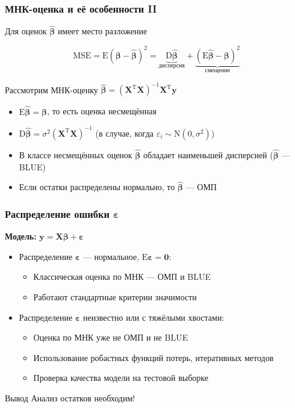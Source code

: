 \documentclass[ucs, notheorems, handout]{beamer}
\newcommand{\betah}{\hat{\bm \beta}}
\newcommand{\betaa}{\bm{\beta}}
\newcommand{\epss}{\bm{\varepsilon}}
\newcommand{\E}{\mathrm{E}}
\newcommand{\D}{\mathrm{D}}
\newcommand{\XT}{{\bm{X}}^{\mathrm{T}}}
\newcommand{\X}{\bm{X}}
\begin{document}
\begin{frame}
     \frametitle{МНК-оценка и её особенности II}
 Для оценок $\betah$ имеет место разложение     \begin{block}{}
$$\mathrm{MSE} = \E(\betaa - \betah)^2 = \underbrace{\mathrm D \betah}_{\text{дисперсия}} + \underbrace{(\mathrm E \betah - \betaa)^2}_{\text{смещение}}$$
\end{block}

Рассмотрим МНК-оценку $\betah = (\X^\mathrm{T}\X)^{-1} \X^\mathrm{T} \bm y$
    
\begin{itemize}
	\item $\E \betah = \betaa$, то есть оценка несмещённая
	\item $\D \betah = \sigma^2 (\XT\X)^{-1}$ (в случае, когда $\varepsilon_i \sim \mathrm N(0, \sigma^2)$)
	\item В классе несмещённых оценок $\betah$ обладает наименьшей дисперсией ($\betah$ --- BLUE)
	\item Если остатки распределены нормально, то $\betah$ --- ОМП
 \end{itemize}


    \note{

    }
\end{frame}


\begin{frame}
    \frametitle{Распределение ошибки $\epss$}
    \textbf{Модель:} $\bm y = \X \betaa + \epss$

\begin{itemize}
	\item Распределение $\epss$ --- нормальное, $\E \epss = \bm 0$:
 \begin{itemize}
 	\item Классическая оценка по МНК --- ОМП и BLUE
	\item Работают стандартные критерии значимости
 \end{itemize}
 		\item Распределение $\epss$ неизвестно или с тяжёлыми хвостами:
 			\begin{itemize}
 				\item Оценка по МНК уже не ОМП и не BLUE
				\item Использование робастных функций потерь, итеративных методов
				\item Проверка качества модели на тестовой выборке
 			\end{itemize}
\end{itemize}

\begin{alertblock}{Вывод}
Анализ остатков необходим!
\end{alertblock}

    \note{

    }
\end{frame}
\end{document}
